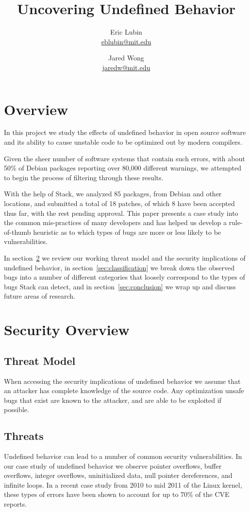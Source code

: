 \documentclass[10pt,twocolumn]{article}
\title{Uncovering Undefined Behavior}
\author{
    Eric Lubin\\
    \href{mailto:eblubin@mit.edu}{eblubin@mit.edu}
\and
    Jared Wong\\
    \href{mailto:jaredw@mit.edu}{jaredw@mit.edu}
}
\newcommand{\NumPackages}{85 }
\newcommand{\NumPatches}{18 }
\newcommand{\NumPatchesAccepted}{8 }
\begin{document}
\maketitle

\section{Overview}
In this project we study the effects of undefined behavior in open source software
and its ability to cause unstable code to be optimized out by modern compilers.

Given the sheer number of software systems that contain such errors, 
with about 50\% of Debian packages reporting over 80,000 different warnings,
we attempted to begin the process of filtering through these results. 

With the help of Stack\cite{stack}, we analyzed \NumPackages packages, from
Debian and other locations, and submitted a total of \NumPatches patches, of
which \NumPatchesAccepted have been accepted thus far, with the rest pending
approval. This paper presents a case study into the common mis-practices of
many developers and has helped us develop a rule-of-thumb heuristic as to which
types of bugs are more or less likely to be vulnerabilities.

In section~\ref{sec:security} we review our working threat model and the
security implications of undefined behavior, in
section~\ref{sec:classification} we break down the observed bugs into a number
of different categories that loosely correspond to the types of bugs Stack
can detect, and in section~\ref{sec:conclusion} we wrap up and discuss future
areas of research.

\section{Security Overview}
\label{sec:security}
\subsection{Threat Model}
When accessing the security implications of undefined behavior we assume that
an attacker has complete knowledge of the source code. Any optimization unsafe
bugs that exist are known to the attacker, and are able to be exploited if
possible.

\subsection{Threats}
Undefined behavior can lead to a number of common security vulnerabilities. In
our case study of undefined behavior we observe pointer overflows, buffer
overflows, integer overflows, uninitialized data, null pointer dereferences,
and infinite loops. In a recent case study from 2010 to mid 2011
\cite{chen-kbugs} of the Linux kernel, these types of errors have been shown to
account for up to 70\% of the CVE reports.
\end{document}
